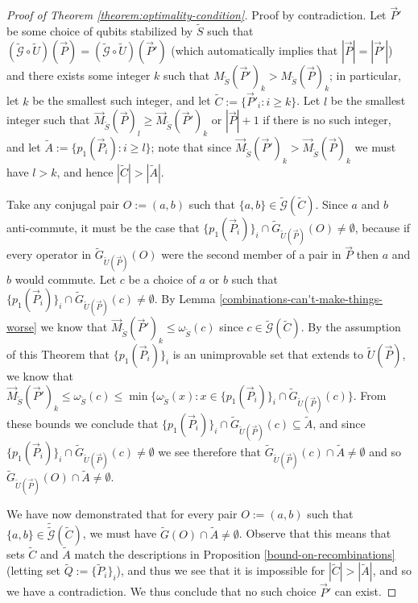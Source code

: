 \documentclass[12pt]{amsbook}
\theoremstyle{plain}
\theoremstyle{definition}
\theoremstyle{remark}
\newcommand{\lst}{\vec}
\newcommand{\set}{\tilde}
\newcommand{\genfun}{\tilde{\mathcal{G}}}
\newcommand{\om}{\omega}
\begin{document}
\begin{proof}[Proof of Theorem \ref{theorem:optimality-condition}]
Proof by contradiction.  Let $\lst P'$ be some choice of qubits stabilized by $\set S$ such that $(\genfun\circ\set U)(\lst P)=(\genfun\circ\set U)(\lst P')$ (which automatically implies that $|\lst P|=|\lst P'|$) and there exists some integer $k$ such that $M_{\set S}(\lst P')_k > M_{\set S}(\lst P)_k$;  in particular, let $k$ be the smallest such integer, and let $\set C:=\{\lst P'_i : i \ge k\}$.  Let $l$ be the smallest integer such that $\lst M_{\set S}(\lst P)_l\ge \lst M_{\set S}(\lst P')_k$ or $|\lst P|+1$ if there is no such integer, and let $\set A := \{p_1(\lst P_i) : i \ge l\}$; note that since $\lst M_{\set S}(\lst P')_k > \lst M_{\set S}(\lst P)_k$ we must have $l>k$, and hence $|\set C| > |\set A|$.

Take any conjugal pair $O:=(a,b)$ such that $\{a,b\}\in\genfun(\set C)$.  Since $a$ and $b$ anti-commute, it must be the case that $\{p_1(\lst P_i)\}_i\cap \set G_{\set U(\lst P)}(O)\ne\emptyset$, because if every operator in $\set G_{\set U(\lst P)}(O)$ were the second member of a pair in $\lst P$ then $a$ and $b$ would commute.  Let $c$ be a choice of $a$ or $b$ such that $\{p_1(\lst P_i)\}_i\cap \set G_{\set U(\lst P)}(c)\ne\emptyset$.  By Lemma \ref{combinations-can't-make-things-worse} we know that $\lst M_{\set S}(\lst P')_k\le\om_{\set S}(c)$ since $c\in\genfun(\set C)$.  By the assumption of this Theorem that $\{p_1(\lst P_i)\}_i$ is an unimprovable set that extends to $\set U(\lst P)$, we know that $\lst M_{\set S}(\lst P')_k \le \om_{\set S}(c)\le\min \{\om_{\set S}(x):x\in\{p_1(\lst P_i)\}_i\cap \set G_{\set U(\lst P)}(c)\}$.  From these bounds we conclude that $\{p_1(\lst P_i)\}_i\cap \set G_{\set U(\lst P)}(c)\subseteq \set A$, and since $\{p_1(\lst P_i)\}_i\cap \set G_{\set U(\lst P)}(c)\ne\emptyset$ we see therefore that $\set G_{\set U(\lst P)}(c)\cap\set A\ne\emptyset$ and so $\set G_{\set U(\lst P)}(O)\cap\set A\ne\emptyset$.

We have now demonstrated that for every pair $O:=(a,b)$ such that $\{a,b\}\in\set \genfun(\set C)$, we must have $\set G(O)\cap\set A \ne\emptyset$.  Observe that this means that sets $\set C$ and $\set A$ match the descriptions in Proposition \ref{bound-on-recombinations} (letting set $\set Q:=\{\set P_i\}_i$), and thus we see that it is impossible for $|\set C|>|\set A|$, and so we have a contradiction.  We thus conclude that no such choice $\lst P'$ can exist.
\end{proof}
\end{document}
